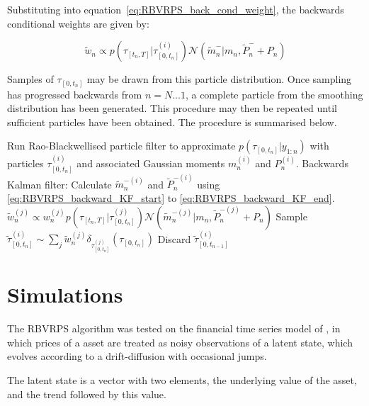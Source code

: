 \documentclass[journal]{IEEEtran}
\begin{document}
Substituting into equation~\ref{eq:RBVRPS_back_cond_weight}, the backwards conditional weights are given by:

\begin{equation}
 \tilde{w}_n \propto p(\tau_{[t_n,T]}|\tau_{[0,t_n]}^{(i)}) \mathcal{N}(\tilde{m}_n^-|m_n, \tilde{P}_n^- + P_n)
\label{eq:RBVRPS_back_cond_weight2}
\end{equation}

Samples of $\tau_{[0,t_n]}$ may be drawn from this particle distribution. Once sampling has progressed backwards from $n=N \dots 1$, a complete particle from the smoothing distribution has been generated. This procedure may then be repeated until sufficient particles have been obtained. The procedure is summarised below.%

\begin{algorithmic}
  \STATE Run Rao-Blackwellised particle filter to approximate $p(\tau_{[0,t_n]}|y_{1:n})$ with particles $\tau_{[0,t_n]}^{(i)}$ and associated Gaussian moments $m_{n}^{(i)}$ and $P_{n}^{(i)}$.
      \STATE Backwards Kalman filter: Calculate $\tilde{m}_n^{-(i)}$ and $\tilde{P}_n^{-(i)}$ using \ref{eq:RBVRPS_backward_KF_start} to \ref{eq:RBVRPS_backward_KF_end}.
	      \STATE $\tilde{w}_n^{(j)} \propto w_n^{(j)} p(\tau_{[t_n,T]}|\tau_{[0,t_n]}^{(j)}) \mathcal{N}(\tilde{m}_n^{-(j)}|m_n, \tilde{P}_n^{-(j)} + P_n)$
      \ENDFOR
      \STATE Sample $\tilde{\tau}_{[0,t_n]}^{(i)} \sim \sum_j \tilde{w}_n^{(j)} \delta_{\tau_{[0,t_n]}^{(j)}}(\tau_{[0,t_n]})$
      \STATE Discard $\tilde{\tau}_{[0,t_{n-1}]}^{(i)}$
    \ENDFOR
  \ENDFOR
\end{algorithmic}



\section{Simulations} \label{sec:simulations}

The RBVRPS algorithm was tested on the financial time series model of \cite{Godsill2007a,Christensen2012}, in which prices of a asset are treated as noisy observations of a latent state, which evolves according to a drift-diffusion with occasional jumps. 

The latent state is a vector with two elements, the underlying value of the asset, and the trend followed by this value.
\end{document}
